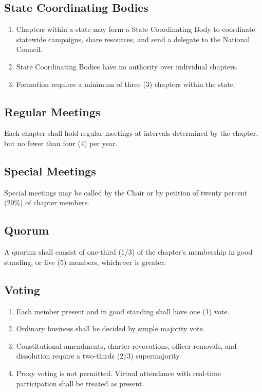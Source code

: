 \documentclass[11pt, letterpaper]{article}
\begin{document}
\subsection{State Coordinating Bodies}
\begin{enumerate}
  \item Chapters within a state may form a State Coordinating Body to coordinate statewide campaigns, share resources, and send a delegate to the National Council.
  \item State Coordinating Bodies have no authority over individual chapters.
  \item Formation requires a minimum of three (3) chapters within the state.
\end{enumerate}



\subsection{Regular Meetings}
Each chapter shall hold regular meetings at intervals determined by the chapter, but no fewer than four (4) per year.

\subsection{Special Meetings}
Special meetings may be called by the Chair or by petition of twenty percent (20\%) of chapter members.

\subsection{Quorum}
A quorum shall consist of one-third (1/3) of the chapter's membership in good standing, or five (5) members, whichever is greater.

\subsection{Voting}
\begin{enumerate}
  \item Each member present and in good standing shall have one (1) vote.
  \item Ordinary business shall be decided by simple majority vote.
  \item Constitutional amendments, charter revocations, officer removals, and dissolution require a two-thirds (2/3) supermajority.
  \item Proxy voting is not permitted. Virtual attendance with real-time participation shall be treated as present.
\end{enumerate}
\end{document}
